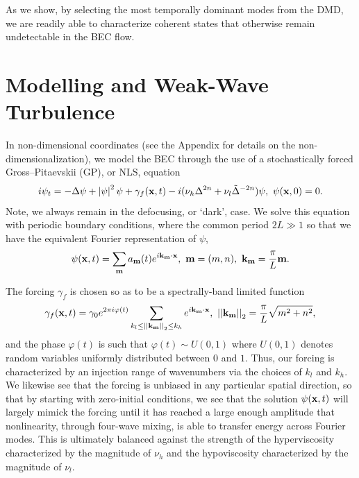 \documentclass[aps,prl,preprint,groupedaddress]{revtex4-1}
\newcommand{\gnorm}[1]{\left|\left| #1\right|\right|}
\begin{document}
As we show, by selecting the most temporally dominant modes from the DMD, we are readily able to characterize coherent states that otherwise remain undetectable in the BEC flow.  

\section*{Modelling and Weak-Wave Turbulence}

In non-dimensional coordinates (see the Appendix for details on the non-dimensionalization), we model the BEC through the use of a stochastically forced Gross--Pitaevskii (GP), or NLS, equation 
\[
i\psi_{t} = -\Delta \psi +  \left| \psi\right|^{2}\psi + \gamma_{f}({\bf x},t) - i(\nu_{h}\Delta^{2n}+\nu_{l}\tilde{\Delta}^{-2n})\psi, ~ \psi({\bf x},0)=0.
\]
Note, we always remain in the defocusing, or `dark', case.  We solve this equation with periodic boundary conditions, where the common period $2L \gg 1$ so that we have the equivalent Fourier representation of $\psi$,
\[
\psi({\bf x},t) = \sum_{{\bf m}} a_{{\bf m}}(t) e^{ i {\bf k}_{{\bf m}}\cdot {\bf x}}, ~ {\bf m} = (m,n), ~ {\bf k}_{{\bf m}} = \frac{\pi}{L}{\bf m}.
\]

The forcing $\gamma_{f}$ is chosen so as to be a spectrally-band limited function 
\[
\gamma_{f}({\bf x},t) = \gamma_{0}e^{2\pi i\varphi(t)}\sum_{k_{l}\leq \gnorm{{\bf k}_{{\bf m}}}_{2} \leq k_{h}} e^{i {\bf k}_{{\bf m}}\cdot {\bf x}}, ~ \gnorm{{\bf k}_{{\bf m}}}_{2} = \frac{\pi}{L}\sqrt{m^{2}+n^{2}},
\]
and the phase $\varphi(t)$ is such that $\varphi(t)  \sim U(0,1)$ where $U(0,1)$ denotes random variables uniformly distributed between $0$ and $1$.  Thus, our forcing is characterized by an injection range of wavenumbers via the choices of $k_{l}$ and $k_{h}$.  We likewise see that the forcing is unbiased in any particular spatial direction, so that by starting with zero-initial conditions, we see that the solution $\psi({\bf x},t)$ will largely mimick the forcing until it has reached a large enough amplitude that nonlinearity, through four-wave mixing, is able to transfer energy across Fourier modes.  This is ultimately balanced against the strength of the hyperviscosity characterized by the magnitude of $\nu_{h}$ and the hypoviscosity characterized by the magnitude of $\nu_{l}$.  
\end{document}
